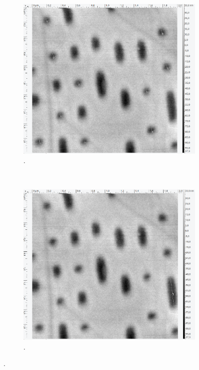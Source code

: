 \begin{figure}[H]
\begin{subfigure}[t]{0.4\textwidth}
	\end{subfigure}
	\\
	\begin{subfigure}[t]{0.4\textwidth}
	\includegraphics[width=\textwidth]{AFM_auswertung/bluray_Lmin.png}
	\caption{.}
	\end{subfigure}
	~
	\begin{subfigure}[t]{0.4\textwidth}
	\includegraphics[width=\textwidth]{AFM_auswertung/bluray_Lmax.png}
	\caption{.}
	\end{subfigure}
\caption{.}
\label{abb:BluRay}
\end{figure}
